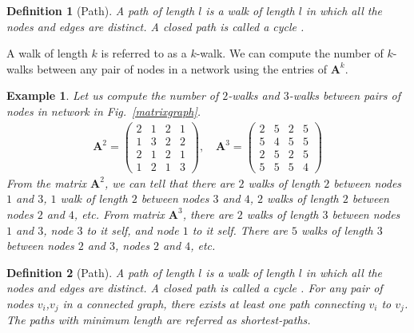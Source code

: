 \documentclass[10pt,a4paper]{article}
\newtheorem{defn}{Definition}
\newtheorem{exa}{Example}
\begin{document}
\begin{defn}[Path]
	A path of length $l$ is a walk of length $l$ in which all the nodes and edges are distinct. A closed path is called a cycle \citep{estrada2011structure}.
\end{defn}

A walk of length $k$ is referred to as a $k$-walk. We can compute the number of $k$-walks between any pair of nodes in a network using the entries of $\mathbf{A}^k$. 

\begin{exa}
	Let us compute the number of $2$-walks and $3$-walks between pairs of nodes in network in Fig.~\ref{matrixgraph}.
	\begin{eqnarray*}
		\mathbf{A}^2 = \begin{pmatrix}
			2 & 1 & 2 & 1 \\
			1 & 3 & 2 & 2 \\
			2 & 1 & 2 & 1  \\
			1 & 2 & 1 & 3
		\end{pmatrix}, \quad
		\mathbf{A}^3 = \begin{pmatrix}
			2 & 5 & 2 & 5 \\
			5 & 4 & 5 & 5 \\
			2 & 5 & 2 & 5 \\
			5 & 5 & 5 & 4
		\end{pmatrix}
	\end{eqnarray*}
	From the matrix $\mathbf{A}^2$, we can tell that there are $2$ walks of length $2$ between nodes $1$ and $3$, $1$ walk of length $2$ between nodes $3$ and $4$, $2$ walks of length $2$ between nodes $2$ and $4$, etc.
	From matrix $\mathbf{A}^3$, there are $2$ walks of length $3$ between nodes $1$ and $3$, node $3$ to it self, and node $1$ to it self. There are $5$ walks of length $3$ between nodes $2$ and $3$, nodes $2$ and $4$, etc.
\end{exa}

\begin{defn}[Path]
	A path of length $l$ is a walk of length $l$ in which all the nodes and edges are distinct. A closed path is called a cycle \citep{estrada2011structure}. For any pair of nodes $v_i$,$v_j$ in a connected graph, there exists at least one path connecting $v_i$ to $v_j$. The paths with minimum length are referred as shortest-paths.
\end{defn}
\end{document}
